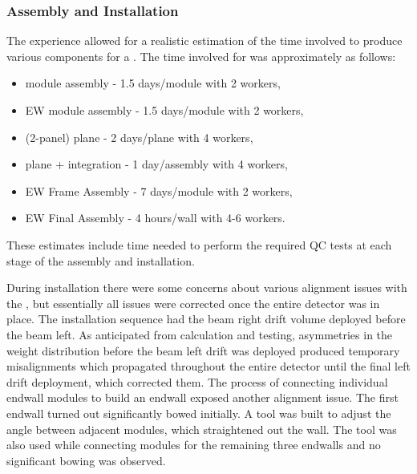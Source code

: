 \subsubsection{Assembly and Installation}
\label{sec:fdsp-hv-protodune-lessons-assy}
The  experience allowed for a realistic estimation of the time involved to produce various  components for a .
The time involved for  was approximately as follows:
\begin{itemize}
\item {} module assembly - 1.5 days/module with 2 workers,
\item EW module assembly - 1.5 days/module with 2 workers,
\item {} (2-panel) plane - 2 days/plane with 4 workers,
\item {} plane +  integration - 1 day/assembly with 4 workers,
\item EW Frame Assembly - 7 days/module with 2 workers,
\item EW Final Assembly - 4 hours/wall with 4-6 workers.
\end{itemize}
These estimates include time needed to perform the required QC tests at each stage of the assembly and installation.

During installation there were some concerns about various alignment issues with the , but essentially all issues were corrected once the entire detector was in place.
The  installation sequence had the beam right drift volume deployed before the beam left.
As anticipated from calculation and testing, asymmetries in the weight distribution before the beam left drift was deployed produced temporary misalignments which propagated throughout the entire detector until the final left drift deployment, which corrected them.
The process of connecting individual endwall modules to build an endwall exposed another alignment issue.
The first endwall turned out significantly bowed initially.
A tool was built to adjust the angle between adjacent modules, which straightened out the wall.
The tool was also used while connecting modules for the remaining three endwalls and no significant bowing was observed.


